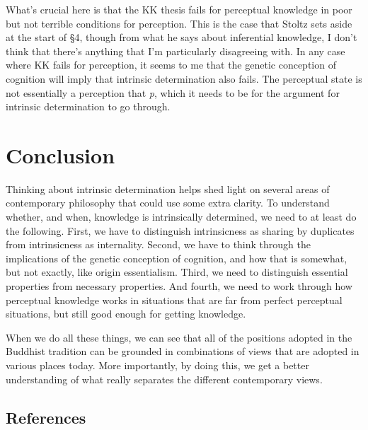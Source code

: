 \documentclass[
  10pt,
  letterpaper,
  DIV=11,
  numbers=noendperiod,
  twoside]{scrartcl}
\begin{document}
What's crucial here is that the KK thesis fails for perceptual knowledge
in poor but not terrible conditions for perception. This is the case
that Stoltz sets aside at the start of §4, though from what he says
about inferential knowledge, I don't think that there's anything that
I'm particularly disagreeing with. In any case where KK fails for
perception, it seems to me that the genetic conception of cognition will
imply that intrinsic determination also fails. The perceptual state is
not essentially a perception that \emph{p}, which it needs to be for the
argument for intrinsic determination to go through.

\section{Conclusion}\label{conclusion}

Thinking about intrinsic determination helps shed light on several areas
of contemporary philosophy that could use some extra clarity. To
understand whether, and when, knowledge is intrinsically determined, we
need to at least do the following. First, we have to distinguish
intrinsicness as sharing by duplicates from intrinsicness as
internality. Second, we have to think through the implications of the
genetic conception of cognition, and how that is somewhat, but not
exactly, like origin essentialism. Third, we need to distinguish
essential properties from necessary properties. And fourth, we need to
work through how perceptual knowledge works in situations that are far
from perfect perceptual situations, but still good enough for getting
knowledge.

When we do all these things, we can see that all of the positions
adopted in the Buddhist tradition can be grounded in combinations of
views that are adopted in various places today. More importantly, by
doing this, we get a better understanding of what really separates the
different contemporary views.

\subsection*{References}\label{references}
\end{document}
